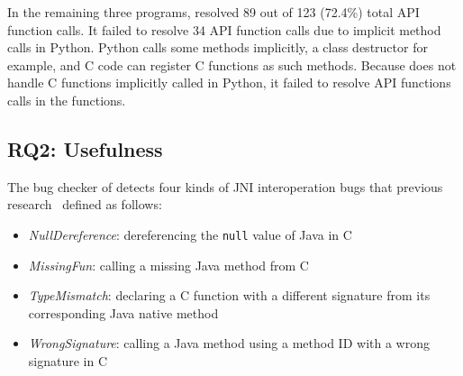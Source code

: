 In the remaining three programs, \ours resolved 89 out of 123 (72.4\%) total
API function calls. 
It failed to resolve 34 API function calls due to implicit method calls in
Python. 
Python calls some methods implicitly, a class destructor for example, and C
code can register C functions as such methods. 
Because \ours does not handle C functions implicitly called in Python, it
failed to resolve API functions calls in the functions.




\subsection{RQ2: Usefulness}

The bug checker of \ours detects four kinds of JNI interoperation bugs
that previous research~\cite{ILEA, LeeASE20} defined as follows:

\begin{itemize}
  \item {\it NullDereference}: dereferencing the {\tt null} value of Java in C
  \item {\it MissingFun}: calling a missing Java method from C
  \item {\it TypeMismatch}: declaring a C function with a different signature
    from its corresponding Java native method
  \item {\it WrongSignature}: calling a Java method using a method ID with a
    wrong signature in C
\end{itemize}


